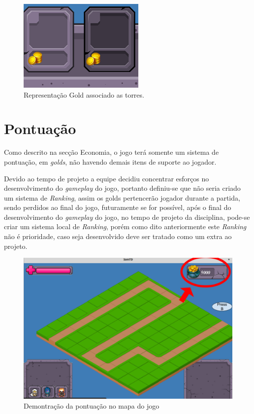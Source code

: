 \documentclass[11pt]{article} %
\begin{document}
\begin{figure}[!htp]
\centering
\includegraphics[scale=1.0]{res/torresGold.png}
\caption{Representação Gold associado as torres.}
\label{Tela Equip}
\end{figure}

\newpage

\section{Pontuação}
Como descrito na secção Economia, o jogo terá somente um sistema de pontuação, em \textit{golds}, não havendo demais itens de suporte ao jogador.

Devido ao tempo de projeto a equipe decidiu concentrar esforços no desenvolvimento do \textit{gameplay} do jogo, portanto definiu-se que não seria criado um sistema de \textit{Ranking}, assim os golds pertencerão jogador durante a partida, sendo perdidos ao final do jogo, futuramente se for possível, após o final do desenvolvimento do \textit{gameplay} do jogo, no tempo de projeto da disciplina, pode-se criar um sistema local de \textit{Ranking}, porém como dito anteriormente este \textit{Ranking} não é prioridade, caso seja desenvolvido deve ser tratado como um extra ao projeto.  

\begin{figure}[!htp]
\centering
\includegraphics[scale=0.3]{res/pontuacao.png}
\caption{Demontração da pontuação no mapa do jogo}
\label{pontuacao}
\end{figure}
 
\end{document}
